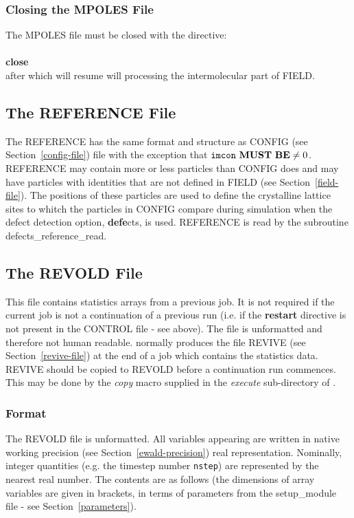 \subsubsection{Closing the MPOLES File}

The MPOLES file must be closed with the directive:\\
\\
{\bf close}
\\
after which \D will resume will processing the intermolecular part of FIELD.

\subsection{The REFERENCE File}
\label{reference-file}

The REFERENCE has the same format and structure as CONFIG
(see Section~\ref{config-file}) file with the exception that
${\tt imcon}~{\bf MUST~BE} \ne 0$.  REFERENCE may contain
more or less particles than CONFIG does and may have
particles with identities that are not defined in FIELD
(see Section~\ref{field-file}).  The positions of these
particles are used to define the crystalline lattice sites
to whitch the particles in CONFIG compare during simulation
when the defect detection option, {\bf defe}cts, is used.
REFERENCE is read by the subroutine {\sc defects\_reference\_read}.

\subsection{The REVOLD File}
\label{revold-file}

This file contains statistics arrays from a previous job.  It is
not required if the current job is not a continuation of a
previous run (i.e. if the {\bf restart} directive is not present
in the CONTROL file - see above).  The file is unformatted and
therefore not human readable.  \D normally produces the file
REVIVE (see Section~\ref{revive-file}) at the end of a job which
contains the statistics data.  REVIVE should be copied to REVOLD
before a continuation run commences.  This may be done by the {\sl
copy} macro supplied in the {\em execute} sub-directory of \D.

\subsubsection{Format}

The REVOLD file is unformatted.  All variables appearing are
written in native working precision (see Section~\ref{ewald-precision})
real representation. Nominally, integer quantities (e.g. the
timestep number {\tt nstep}) are represented by the nearest
real number.  The contents are as follows (the dimensions of
array variables are given in brackets, in terms of parameters
from the {\sc setup\_module} file - see Section~\ref{parameters}).

